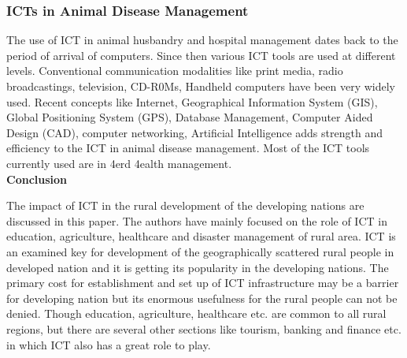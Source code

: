 \documentclass[11pt,largemargins]{homework}
\begin{document}
\subsubsection{ICTs in Animal Disease Management}
The use of ICT in animal husbandry and hospital management dates back to the period of arrival of computers. Since then various ICT tools are used at different levels. Conventional communication modalities like print media, radio broadcastings, television, CD-R0Ms, Handheld computers have been very widely used. Recent concepts like Internet, Geographical Information System (GIS), Global Positioning System (GPS), Database Management, Computer Aided Design (CAD), computer networking, Artificial Intelligence adds strength and efficiency to the ICT in animal disease management. Most of the ICT tools currently used are in 4erd 4ealth management.\\

\textbf{Conclusion}

The impact of ICT in the rural development of the developing nations are discussed in this paper. The authors have mainly focused on the role of ICT in education, agriculture, healthcare and disaster management of rural area. ICT is an examined key for development of the geographically scattered rural people in developed nation and it is getting its popularity in the developing nations. The primary cost for establishment and set up of ICT infrastructure may be a barrier for developing nation but its enormous usefulness for the rural people can not be denied. Though education, agriculture, healthcare etc. are common to all rural regions, but there are several other sections like tourism, banking and finance etc. in which ICT also has a great role to play.\\

\end{document}
